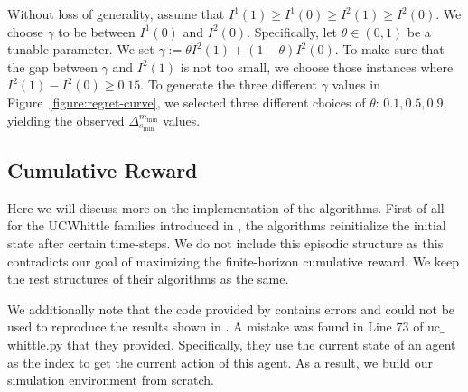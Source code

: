 Without loss of generality, assume that $I^1(1)\geq I^1(0)\geq I^2(1)\geq I^2(0)$. We choose $\gamma$ to be between $I^1(0)$ and $I^2(0)$. Specifically, let $\theta\in(0,1)$ be a tunable parameter. We set
$\gamma:=\theta I^2(1)+(1-\theta)I^2(0)$. To make sure that the gap between $\gamma$ and $I^2(1)$ is not too small, we choose those instances where $I^2(1)-I^2(0)\geq 0.15$. 
To generate the three different $\gamma$ values in Figure~\ref{figure:regret-curve}, we selected
three different choices of $\theta$:
$0.1,0.5,0.9$, yielding the observed $\Delta_{s_{\min}}^{m_{\min}}$ values.




\subsection{Cumulative Reward}\label{subsec:exp-detail-cumulative}
Here we will discuss more on the implementation of the algorithms.
First of all 
for the UCWhittle families introduced in \citet{wang2023optimistic}, the algorithms
reinitialize the initial state after certain time-steps. We do not include this episodic structure as this contradicts our goal of maximizing the finite-horizon cumulative reward.
We keep the rest structures of their algorithms as the same.

We additionally note that the code provided by
\citet{wang2023optimistic} contains errors and could not be used to 
reproduce the results shown in \citet{wang2023optimistic}.
A mistake was found in
Line 73 of uc$\_$whittle.py that they provided. Specifically, they use the current state of an agent as the index to get the current action of this agent. 
As a result, we build our simulation environment from scratch. 

